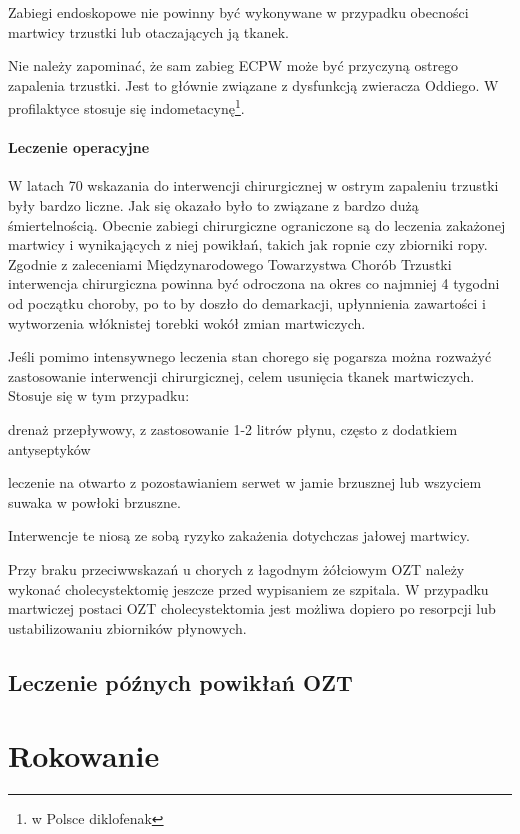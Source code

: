 \documentclass[a4paper, 12pt]{report}
\begin{document}
Zabiegi endoskopowe nie powinny być wykonywane w przypadku obecności
martwicy trzustki lub otaczających ją tkanek.

Nie należy zapominać, że sam zabieg ECPW może być przyczyną ostrego
zapalenia trzustki. Jest to głównie związane z dysfunkcją zwieracza
Oddiego. W profilaktyce stosuje się indometacynę\footnote{w Polsce diklofenak}.

\subsubsection{Leczenie operacyjne}

W latach 70 wskazania do interwencji chirurgicznej w ostrym zapaleniu
trzustki były bardzo liczne. Jak się okazało było to związane z bardzo
dużą śmiertelnością. Obecnie zabiegi chirurgiczne ograniczone są do
leczenia zakażonej martwicy i wynikających z niej powikłań, takich jak
ropnie czy zbiorniki ropy. Zgodnie z zaleceniami Międzynarodowego
Towarzystwa Chorób Trzustki interwencja chirurgiczna powinna być
odroczona na okres co najmniej 4 tygodni od początku choroby, po to by
doszło do demarkacji, upłynnienia zawartości i wytworzenia włóknistej
torebki wokół zmian martwiczych.

Jeśli pomimo intensywnego leczenia stan chorego się pogarsza można
rozważyć zastosowanie interwencji chirurgicznej, celem usunięcia
tkanek martwiczych. Stosuje się w tym przypadku:
\begin{inparaenum}
\item drenaż przepływowy, z zastosowanie 1-2 litrów płynu, często z
  dodatkiem antyseptyków
\item leczenie na otwarto z pozostawianiem serwet w jamie brzusznej
  lub wszyciem suwaka w powłoki brzuszne.
\end{inparaenum}
Interwencje te niosą ze sobą ryzyko zakażenia dotychczas jałowej
martwicy.

Przy braku przeciwwskazań u chorych z łagodnym żółciowym OZT należy
wykonać cholecystektomię jeszcze przed wypisaniem ze szpitala. W
przypadku martwiczej postaci OZT cholecystektomia jest możliwa dopiero
po resorpcji lub ustabilizowaniu zbiorników płynowych.

\section{Leczenie późnych powikłań OZT}

\chapter{Rokowanie}
\end{document}
